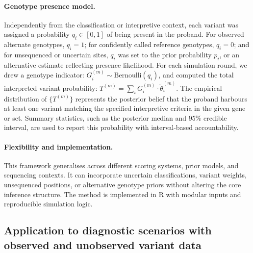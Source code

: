 \paragraph{Genotype presence model.}
Independently from the classification or interpretive context, each variant was assigned a probability \( q_i \in [0,1] \) of being present in the proband. For observed alternate genotypes, \( q_i = 1 \); for confidently called reference genotypes, \( q_i = 0 \); and for unsequenced or uncertain sites, \( q_i \) was set to the prior probability \( p_i \), or an alternative estimate reflecting presence likelihood.
For each simulation round, we drew a genotype indicator:
$G_i^{(m)} \sim \text{Bernoulli}(q_i)$,
and computed the total interpreted variant probability:
$
T^{(m)} = \sum_i G_i^{(m)} \cdot \tilde{\theta}_i^{(m)}$.
The empirical distribution of \( \{T^{(m)}\} \) represents the posterior belief that the proband harbours at least one variant matching the specified interpretive criteria in the given gene or set. Summary statistics, such as the posterior median and 95\% credible interval, are used to report this probability with interval-based accountability.

\paragraph{Flexibility and implementation.}
This framework generalises across different scoring systems, prior models, and sequencing contexts. It can incorporate uncertain classifications, variant weights, unsequenced positions, or alternative genotype priors without altering the core inference structure. The method is implemented in R with modular inputs and reproducible simulation logic.

\subsection{Application to diagnostic scenarios with observed and unobserved variant data}

